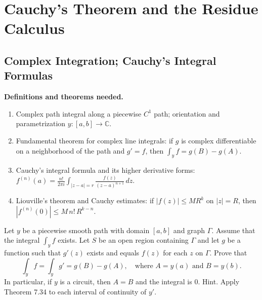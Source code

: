 
\chapter{Cauchy's Theorem and the Residue Calculus}
\section{Complex Integration; Cauchy's Integral Formulas}

\noindent\textbf{Definitions and theorems needed.}
\begin{enumerate}[label=(\alph*)]
\item Complex path integral along a piecewise $C^1$ path; orientation and parametrization $y:[a,b]\to\mathbb C$.
\item Fundamental theorem for complex line integrals: if $g$ is complex differentiable on a neighborhood of the path and $g'=f$, then $\int_y f= g(B)-g(A)$.
\item Cauchy's integral formula and its higher derivative forms: $f^{(n)}(a)=\frac{n!}{2\pi i}\int_{|z-a|=r} \frac{f(z)}{(z-a)^{n+1}}\,dz$.
\item Liouville's theorem and Cauchy estimates: if $|f(z)|\le M R^k$ on $|z|=R$, then $|f^{(n)}(0)|\le M\, n!\, R^{k-n}$.
\end{enumerate}



\begin{problembox}
Let \( y \) be a piecewise smooth path with domain \([a, b]\) and graph \(\Gamma\). Assume that the integral \( \int_y f \) exists. Let \( S \) be an open region containing \(\Gamma\) and let \( g \) be a function such that \( g'(z) \) exists and equals \( f(z) \) for each \( z \) on \(\Gamma\). Prove that
\[\int_y f = \int_y g' = g(B) - g(A), \quad \text{where } A = y(a) \text{ and } B = y(b).\]
In particular, if \( y \) is a circuit, then \( A = B \) and the integral is 0. Hint. Apply Theorem 7.34 to each interval of continuity of \( y' \).
\end{problembox}


